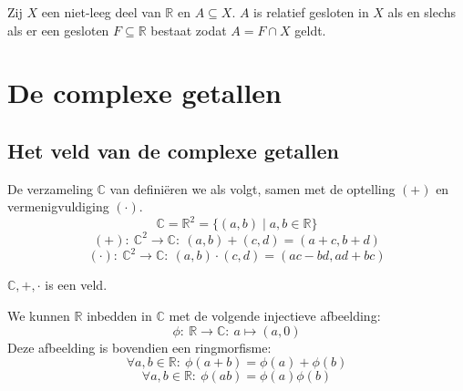 \documentclass[main.tex]{subfiles}
\begin{document}
\begin{pr}
  Zij $X$ een niet-leeg deel van $\mathbb{R}$ en $A \subseteq X$.
  $A$ is relatief gesloten in $X$ als en slechs als er een gesloten $F \subseteq \mathbb{R}$ bestaat zodat $A=F \cap X$ geldt.
\end{pr}


\section{De complexe getallen}
\label{sec:de-complexe-getallen}

\subsection{Het veld van de complexe getallen}
\label{sec:het-veld-van}


\begin{de}
  De verzameling $\mathbb{C}$ van  defini\"eren we als volgt, samen met de optelling $(+)$ en vermenigvuldiging $(\cdot)$.
  \[ \mathbb{C} = \mathbb{R}^{2} = \{ (a,b) \mid a,b\in \mathbb{R} \} \]
  \[ (+):\ \mathbb{C}^{2} \rightarrow \mathbb{C}:\ (a,b) + (c,d) = (a+c,b+d) \]
  \[ (\cdot):\ \mathbb{C}^{2} \rightarrow \mathbb{C}:\ (a,b) \cdot (c,d) = (ac-bd, ad+bc) \]
\end{de}

\begin{st}
  $\mathbb{C},+,\cdot$ is een veld.
\end{st}

\begin{pr}
  We kunnen $\mathbb{R}$ inbedden in $\mathbb{C}$ met de volgende injectieve afbeelding:
  \[ \phi:\ \mathbb{R} \rightarrow \mathbb{C}:\ a \mapsto (a,0) \]
  Deze afbeelding is bovendien een ringmorfisme:
  \[ \forall a,b \in \mathbb{R}:\ \phi(a+b) = \phi(a) + \phi(b) \]
  \[ \forall a,b \in \mathbb{R}:\ \phi(ab) = \phi(a)\phi(b) \] 
\end{pr}
\end{document}
